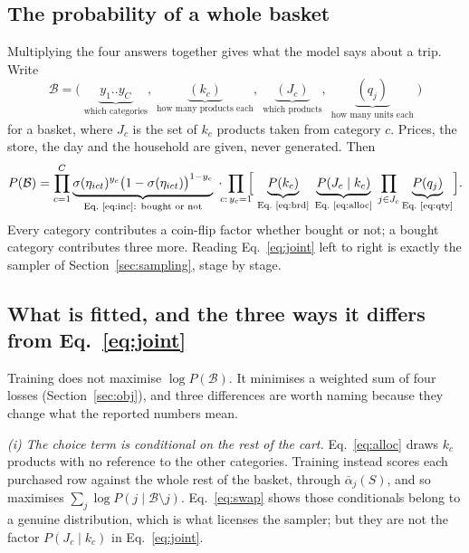 \documentclass[11pt]{article}
\begin{document}
\subsection{The probability of a whole basket}
\label{sec:joint}

Multiplying the four answers together gives what the model says about a trip. Write
\begin{equation}
\mathcal{B}=\bigl(\;\underbrace{y_1..y_C}_{\text{which categories}},\;
\underbrace{(k_c)}_{\text{how many products each}},\;
\underbrace{(J_c)}_{\text{which products}},\;
\underbrace{(q_j)}_{\text{how many units each}}\;\bigr)
\end{equation}
for a basket, where $J_c$ is the set of $k_c$ products taken from category $c$. Prices,
the store, the day and the household are given, never generated. Then
\begin{equation}
P(\mathcal{B})=
\prod_{c=1}^{C}\underbrace{\sigma(\eta_{ict})^{y_c}\bigl(1-\sigma(\eta_{ict})\bigr)^{1-y_c}}_{\text{Eq.~\ref{eq:inc}: bought or not}}
\;\cdot\!\!\prod_{c:\,y_c=1}\!\!\Bigl[\;
\underbrace{P(k_c)}_{\text{Eq.~\ref{eq:brd}}}\;
\underbrace{P(J_c\mid k_c)}_{\text{Eq.~\ref{eq:alloc}}}\;
\prod_{j\in J_c}\underbrace{P(q_j)}_{\text{Eq.~\ref{eq:qty}}}\Bigr].
\label{eq:joint}
\end{equation}
Every category contributes a coin-flip factor whether bought or not; a bought category
contributes three more. Reading Eq.~\ref{eq:joint} left to right is exactly the sampler of
Section~\ref{sec:sampling}, stage by stage.

\subsection{What is fitted, and the three ways it differs from Eq.~\ref{eq:joint}}
\label{sec:fitgap}

Training does not maximise $\log P(\mathcal{B})$. It minimises a weighted sum of four
losses (Section~\ref{sec:obj}), and three differences are worth naming because they change
what the reported numbers mean.

\emph{(i) The choice term is conditional on the rest of the cart.} Eq.~\ref{eq:alloc}
draws $k_c$ products with no reference to the other categories. Training instead scores
each purchased row against the whole rest of the basket, through $\bar\alpha_j(S)$, and so
maximises $\sum_j\log P(j\mid\mathcal{B}\setminus j)$. Eq.~\ref{eq:swap} shows those
conditionals belong to a genuine distribution, which is what licenses the sampler; but
they are not the factor $P(J_c\mid k_c)$ in Eq.~\ref{eq:joint}.
\end{document}
